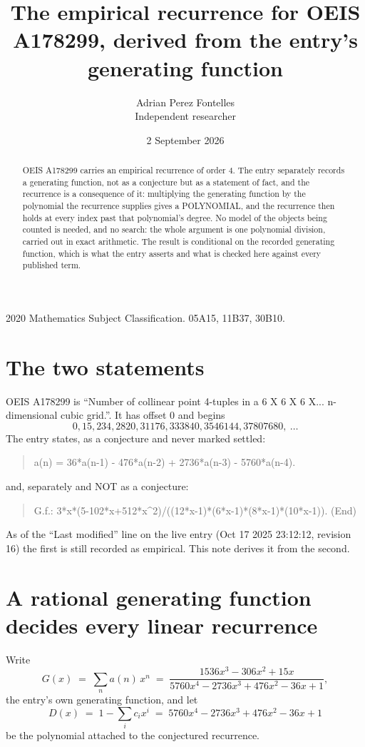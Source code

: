 \documentclass[11pt,a4paper]{article}
\title{The empirical recurrence for OEIS A178299, derived from the entry's generating function}
\author{Adrian Perez Fontelles\\ \small Independent researcher}
\date{2 September 2026}
\theoremstyle{plain}
\theoremstyle{definition}
\begin{document}
\maketitle

\begin{abstract}
OEIS A178299 carries an empirical recurrence of order $4$. The entry separately records a
generating function, not as a conjecture but as a statement of fact, and the recurrence is a
consequence of it: multiplying the generating function by the polynomial the recurrence
supplies gives a POLYNOMIAL, and the recurrence then holds at every index past that
polynomial's degree. No model of the objects being counted is needed, and no search: the
whole argument is one polynomial division, carried out in exact arithmetic. The result is
conditional on the recorded generating function, which is what the entry asserts and what is
checked here against every published term.
\end{abstract}

\noindent\small 2020 Mathematics Subject Classification. 05A15, 11B37, 30B10.\normalsize

\section{The two statements}

OEIS A178299 is ``Number of collinear point 4-tuples in a 6 X 6 X 6 X... n-dimensional cubic grid.''. It has offset $0$ and begins
\[
0, 15, 234, 2820, 31176, 333840, 3546144, 37807680,\ \dots
\]
The entry states, as a conjecture and never marked settled:
\begin{quote}
a(n) = 36*a(n-1) - 476*a(n-2) + 2736*a(n-3) - 5760*a(n-4).
\end{quote}
and, separately and NOT as a conjecture:
\begin{quote}
G.f.: 3*x*(5-102*x+512*x\^{}2)/((12*x-1)*(6*x-1)*(8*x-1)*(10*x-1)). (End)
\end{quote}
As of the ``Last modified'' line on the live entry (Oct 17 2025 23:12:12, revision 16) the first is still
recorded as empirical. This note derives it from the second.

\section{A rational generating function decides every linear recurrence}

Write
\[
G(x)\;=\;\sum_{n}a(n)\,x^{n}\;=\;\frac{1536 x^{3} - 306 x^{2} + 15 x}{5760 x^{4} - 2736 x^{3} + 476 x^{2} - 36 x + 1},
\]
the entry's own generating function, and let
\[
D(x)\;=\;1-\sum_i c_i x^{i}\;=\;5760 x^{4} - 2736 x^{3} + 476 x^{2} - 36 x + 1
\]
be the polynomial attached to the conjectured recurrence.
\end{document}
